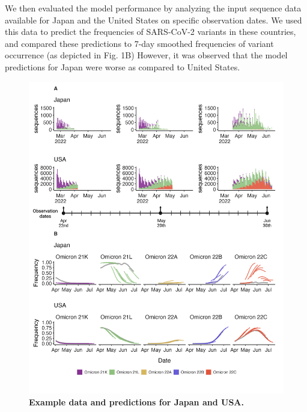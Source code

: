 \documentclass[11pt,oneside,letterpaper]{article}
\begin{document}
We then evaluated the model performance by analyzing the input sequence data available for Japan and the United States on specific observation dates.
We used this data to predict the frequencies of SARS-CoV-2 variants in these countries, and compared these predictions to 7-day smoothed frequencies of variant occurrence (as depicted in Fig. 1B)
However, it was observed that the model predictions for Japan were worse as compared to United States.


\begin{figure}[H]
	\centering
	\includegraphics[width=1.0\textwidth]{figures/Figure1Final.png}
	\caption{\textbf{Example data and predictions for Japan and USA.}
}
\end{figure}
\end{document}
